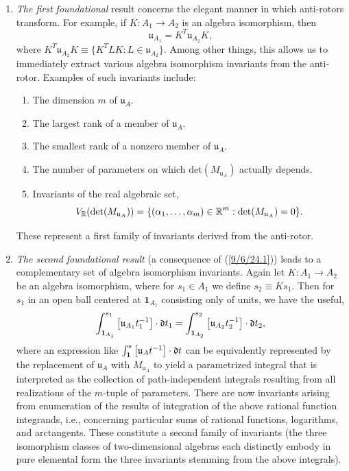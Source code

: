 \documentclass{amsart}
\numberwithin{equation}{section}
\theoremstyle{definition}
\numberwithin{theorem}{section}
\begin{document}
\begin{enumerate} 
\item   {\it The first foundational} result concerns the elegant manner in which \mbox{anti-rotors} transform.   For example, if $K:A_1\rightarrow A_2$ is an algebra isomorphism, then \begin{equation}\label{9/6/24.1} \mathfrak{u}_{A_1} = K^T \mathfrak{u}_{A_2} K, \end{equation}
where $ K^T \mathfrak{u}_{A_2} K \equiv \{K^T L K:L\in\mathfrak{u}_{A_2}\}$.
Among other things, this allows us to immediately extract various algebra isomorphism invariants from the anti-rotor.    Examples of such invariants include: \begin{enumerate} \item The dimension $m$ of $\mathfrak{u}_A$.   \item The largest rank  of a member of $\mathfrak{u}_A$.  \item The smallest rank of a nonzero member of $\mathfrak{u}_A$. \item The number of parameters on which $\text{det}(M_{\mathfrak{u}_A})$ actually depends. \item Invariants of the real algebraic set, \[V_\mathbb{R}({\rm det}(M_{\mathfrak{u}_A})) = \{(\alpha_1,\dots,\alpha_m)\in\mathbb{R}^m: {\rm det}(M_{\mathfrak{u}_A}) = 0 \}.\] \end{enumerate}  These represent a first family of invariants derived from the anti-rotor.
  \item {\it The second foundational result} (a consequence of (\ref{9/6/24.1})) leads to a complementary set of algebra isomorphism invariants.  Again let $K:A_1\rightarrow A_2$ be an algebra isomorphism, where for $s_1\in A_1$ we define $s_2\equiv Ks_1$.  Then for $s_1$ in an open ball centered at $\mathbf{1}_{A_1}$ consisting only of units, we have the useful, \begin{equation}\label{8/30/24.1} \int_{{\bf 1}_{A_1}}^{s_1} \left[\mathfrak{u}_{A_1}t_1^{-1}\right]\cdot \mathfrak{d}t_1 
= \int_{{\bf 1}_{A_2}}^{s_2} \left[\mathfrak{u}_{A_2}t_2^{-1}\right]\cdot \mathfrak{d}t_2, \end{equation} where an expression like $\int_{{\bf 1}}^{s} \left[\mathfrak{u}_At^{-1}\right]\cdot \mathfrak{d}t$ can be equivalently represented by the replacement of $\mathfrak{u}_A$ with $M_{\mathfrak{u}_A}$ to yield a parametrized integral that is interpreted as the collection of path-independent integrals resulting from all realizations of the $m$-tuple of parameters.  There are now invariants arising from enumeration of the results of integration of the above rational function integrands, i.e., concerning particular sums of rational functions, logarithms, and arctangents.  These constitute a second family of invariants (the three isomorphism classes of two-dimensional algebras each distinctly embody in pure elemental form the three invariants stemming from the above integrals).

\end{enumerate}
\end{document}
